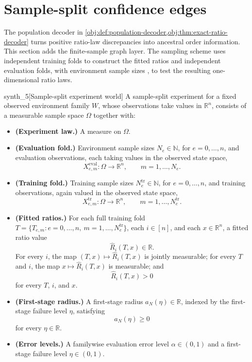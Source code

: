 \section{Sample-split confidence edges}\label{sec:confidence-edges}

The population decoder in \cref{obj:def:population-decoder,obj:thm:exact-ratio-decoder} turns positive ratio-law discrepancies into ancestral order information. This section adds the finite-sample graph layer. The sampling scheme uses independent training folds to construct the fitted ratios  and independent evaluation folds, with environment sample sizes , to test the resulting one-dimensional ratio laws.

\begin{definitionv}{synth_5}[Sample-split experiment world]
A sample-split experiment for a fixed observed environment family \(W\), whose observations take values in \(\mathbb R^n\), consists of a measurable sample space \(\Omega\) together with:
\begin{itemize}
\item \textbf{(Experiment law.)} A measure on \(\Omega\).
\item \textbf{(Evaluation fold.)} Environment sample sizes \(N_e\in\mathbb N\), for \(e=0,\ldots,n\), and evaluation observations, each taking values in the observed state space,
\[
X^{\mathrm{eval}}_{e,m}:\Omega\to\mathbb R^n,
\qquad
m=1,\ldots,N_e .
\]
\item \textbf{(Training fold.)} Training sample sizes \(N^{\mathrm{tr}}_e\in\mathbb N\), for \(e=0,\ldots,n\), and training observations, again valued in the observed state space,
\[
X^{\mathrm{tr}}_{e,m}:\Omega\to\mathbb R^n,
\qquad
m=1,\ldots,N^{\mathrm{tr}}_e .
\]
\item \textbf{(Fitted ratios.)} For each full training fold \(T=\{T_{e,m}:e=0,\ldots,n,\ m=1,\ldots,N^{\mathrm{tr}}_e\}\), each \(i\in[n]\), and each \(x\in\mathbb R^n\), a fitted ratio value
\[
\widehat R_i(T,x)\in\mathbb R .
\]
For every \(i\), the map \((T,x)\mapsto \widehat R_i(T,x)\) is jointly measurable; for every \(T\) and \(i\), the map \(x\mapsto \widehat R_i(T,x)\) is measurable; and
\[
\widehat R_i(T,x)>0
\]
for every \(T\), \(i\), and \(x\).
\item \textbf{(First-stage radius.)} A first-stage radius \(a_N(\eta)\in\mathbb R\), indexed by the first-stage failure level \(\eta\), satisfying
\[
a_N(\eta)\ge 0
\]
for every \(\eta\in\mathbb R\).
\item \textbf{(Error levels.)} A familywise evaluation error level \(\alpha\in(0,1)\) and a first-stage failure level \(\eta\in(0,1)\).
\end{itemize}
\end{definitionv}

